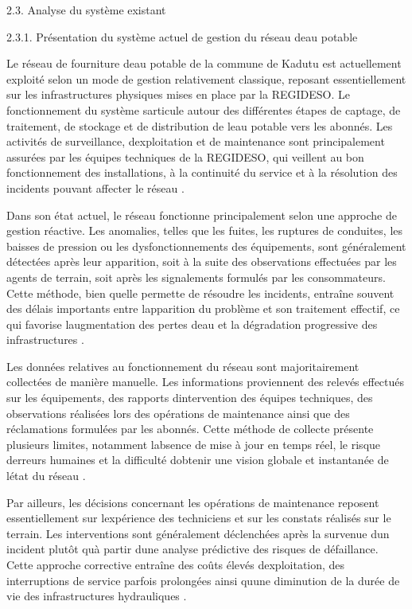 \documentclass[12pt,a4paper,oneside]{report}
\begin{document}
2.3. Analyse du système existant

2.3.1. Présentation du système actuel de gestion du réseau
d\textquotesingle eau potable

Le réseau de fourniture d\textquotesingle eau potable de la commune de
Kadutu est actuellement exploité selon un mode de gestion relativement
classique, reposant essentiellement sur les infrastructures physiques
mises en place par la REGIDESO. Le fonctionnement du système
s\textquotesingle articule autour des différentes étapes de captage, de
traitement, de stockage et de distribution de l\textquotesingle eau
potable vers les abonnés. Les activités de surveillance,
d\textquotesingle exploitation et de maintenance sont principalement
assurées par les équipes techniques de la REGIDESO, qui veillent au bon
fonctionnement des installations, à la continuité du service et à la
résolution des incidents pouvant affecter le réseau \cite{ref95}.

Dans son état actuel, le réseau fonctionne principalement selon une
approche de gestion réactive. Les anomalies, telles que les fuites, les
ruptures de conduites, les baisses de pression ou les dysfonctionnements
des équipements, sont généralement détectées après leur apparition, soit
à la suite des observations effectuées par les agents de terrain, soit
après les signalements formulés par les consommateurs. Cette méthode,
bien qu\textquotesingle elle permette de résoudre les incidents,
entraîne souvent des délais importants entre
l\textquotesingle apparition du problème et son traitement effectif, ce
qui favorise l\textquotesingle augmentation des pertes
d\textquotesingle eau et la dégradation progressive des infrastructures
\cite{ref90}.

Les données relatives au fonctionnement du réseau sont majoritairement
collectées de manière manuelle. Les informations proviennent des relevés
effectués sur les équipements, des rapports
d\textquotesingle intervention des équipes techniques, des observations
réalisées lors des opérations de maintenance ainsi que des réclamations
formulées par les abonnés. Cette méthode de collecte présente plusieurs
limites, notamment l\textquotesingle absence de mise à jour en temps
réel, le risque d\textquotesingle erreurs humaines et la difficulté
d\textquotesingle obtenir une vision globale et instantanée de
l\textquotesingle état du réseau \cite{ref4}.

Par ailleurs, les décisions concernant les opérations de maintenance
reposent essentiellement sur l\textquotesingle expérience des
techniciens et sur les constats réalisés sur le terrain. Les
interventions sont généralement déclenchées après la survenue
d\textquotesingle un incident plutôt qu\textquotesingle à partir
d\textquotesingle une analyse prédictive des risques de défaillance.
Cette approche corrective entraîne des coûts élevés
d\textquotesingle exploitation, des interruptions de service parfois
prolongées ainsi qu\textquotesingle une diminution de la durée de vie
des infrastructures hydrauliques \cite{ref98}.
\end{document}

